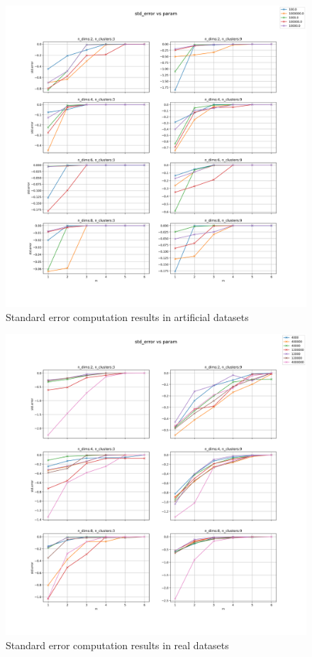 \begin{figure}[!ht]
    \includegraphics[width=\linewidth]{images/experiments/std_error_artificial.png}
    \caption{Standard error computation results in artificial datasets}
    \label{fig:error_art}
\end{figure}

\begin{figure}[!ht]
    \includegraphics[width=\linewidth]{images/experiments/std_error_real.png}
    \caption{Standard error computation results in real datasets}
    \label{fig:error_real}
\end{figure}

